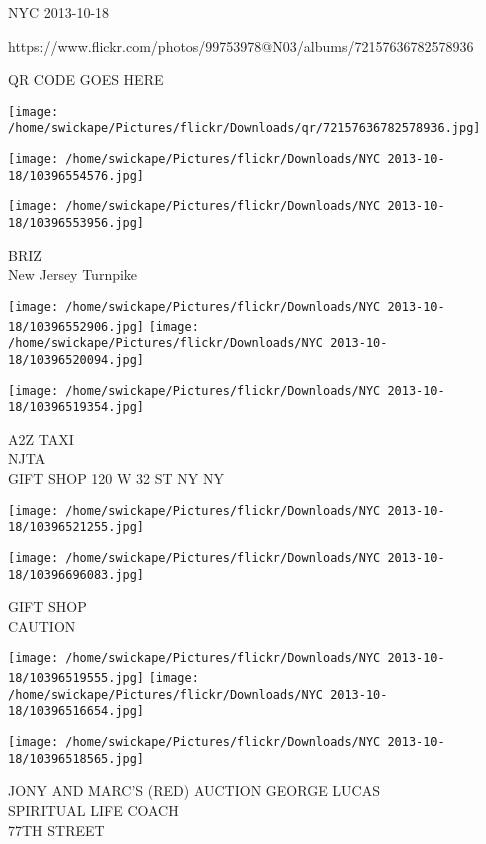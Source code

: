 \documentclass[10pt,letterpaper]{article}
\begin{document}
NYC 2013-10-18

https://www.flickr.com/photos/99753978@N03/albums/72157636782578936

QR CODE GOES HERE

\texttt{[image: /home/swickape/Pictures/flickr/Downloads/qr/72157636782578936.jpg]}
\pagebreak

\texttt{[image: /home/swickape/Pictures/flickr/Downloads/NYC 2013-10-18/10396554576.jpg]}

\vspace{0.25in}
\texttt{[image: /home/swickape/Pictures/flickr/Downloads/NYC 2013-10-18/10396553956.jpg]}

BRIZ\\
New Jersey Turnpike\\
\pagebreak

\texttt{[image: /home/swickape/Pictures/flickr/Downloads/NYC 2013-10-18/10396552906.jpg]}
\texttt{[image: /home/swickape/Pictures/flickr/Downloads/NYC 2013-10-18/10396520094.jpg]}

\vspace{0.25in}
\texttt{[image: /home/swickape/Pictures/flickr/Downloads/NYC 2013-10-18/10396519354.jpg]}

A2Z TAXI\\
NJTA\\
GIFT SHOP 120 W 32 ST NY NY\\
\pagebreak

\texttt{[image: /home/swickape/Pictures/flickr/Downloads/NYC 2013-10-18/10396521255.jpg]}

\vspace{0.25in}
\texttt{[image: /home/swickape/Pictures/flickr/Downloads/NYC 2013-10-18/10396696083.jpg]}

GIFT SHOP\\
CAUTION\\
\pagebreak

\texttt{[image: /home/swickape/Pictures/flickr/Downloads/NYC 2013-10-18/10396519555.jpg]}
\texttt{[image: /home/swickape/Pictures/flickr/Downloads/NYC 2013-10-18/10396516654.jpg]}

\vspace{0.25in}
\texttt{[image: /home/swickape/Pictures/flickr/Downloads/NYC 2013-10-18/10396518565.jpg]}

JONY AND MARC'S (RED) AUCTION GEORGE LUCAS\\
SPIRITUAL LIFE COACH\\
77TH STREET\\
\pagebreak
\end{document}
